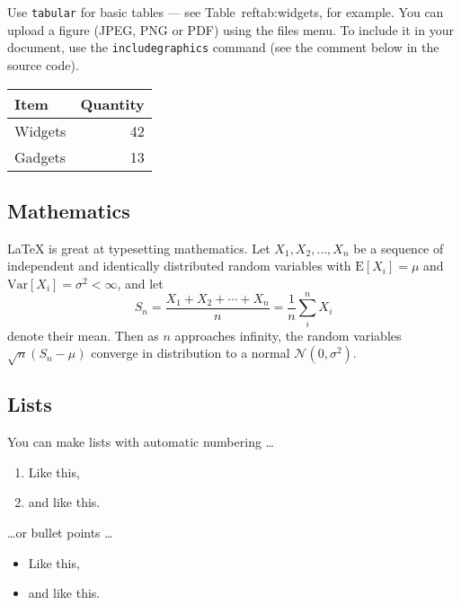\documentclass[12pt]{article}
\begin{document}
Use \texttt{tabular} for basic tables --- see Table~ref{tab:widgets}, for example. You can upload a figure (JPEG, PNG or PDF) using the files menu. To include it in your document, use the \texttt{includegraphics} command (see the comment below in the source code).


\begin{tabular}{l|r}
Item & Quantity \\\hline
Widgets & 42 \\
Gadgets & 13
\end{tabular}

\subsection{Mathematics}

\LaTeX{} is great at typesetting mathematics. Let $X_1, X_2, \ldots, X_n$ be a sequence of independent and identically distributed random variables with $\text{E}[X_i] = \mu$ and $\text{Var}[X_i] = \sigma^2 < \infty$, and let
$$S_n = \frac{X_1 + X_2 + \cdots + X_n}{n}
      = \frac{1}{n}\sum_{i}^{n} X_i$$
denote their mean. Then as $n$ approaches infinity, the random variables $\sqrt{n}(S_n - \mu)$ converge in distribution to a normal $\mathcal{N}(0, \sigma^2)$.

\subsection{Lists}

You can make lists with automatic numbering \dots

\begin{enumerate}
\item Like this,
\item and like this.
\end{enumerate}
\dots or bullet points \dots
\begin{itemize}
\item Like this,
\item and like this.
\end{itemize}
\end{document}

